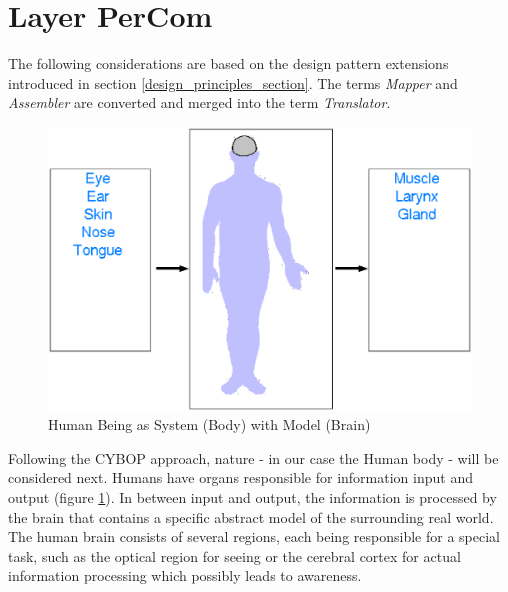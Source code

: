 \section{Layer PerCom}
\label{layer_percom_section}

The following considerations are based on the design pattern extensions introduced
in section \ref{design_principles_section}. The terms \emph{Mapper} and \emph{Assembler}
are converted and merged into the term \emph{Translator}.

\begin{figure}[ht]
    \begin{center}
       \includegraphics[scale=0.3]{images/human_being_as_system.eps}
       \caption{Human Being as System (Body) with Model (Brain)}
       \label{human_being_as_system_figure}
    \end{center}
\end{figure}

Following the CYBOP approach, nature - in our case the Human body - will be
considered next. Humans have organs responsible for information input and output
(figure \ref{human_being_as_system_figure}). In between input and output, the
information is processed by the brain that contains a specific abstract model
of the surrounding real world. The human brain consists of several regions, each
being responsible for a special task, such as the optical region for seeing or the
cerebral cortex for actual information processing which possibly leads to awareness.

